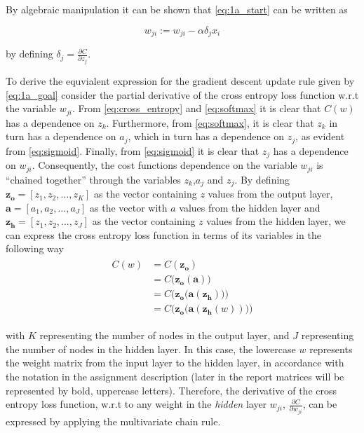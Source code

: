 \documentclass{article}
\begin{document}
By algebraic manipulation it can be shown that \eqref{eq:1a_start} can be written as

\begin{equation}
    w_{j i}:=w_{j i}-\alpha \delta_{j} x_{i}
    \label{eq:1a_goal}
\end{equation}

by defining $\delta_{j}=\frac{\partial C}{\partial z_{j}}$.

To derive the equvialent expression for the gradient descent update rule given by \eqref{eq:1a_goal} consider the partial derivative of the cross entropy loss function w.r.t the variable $w_{ji}$. From \eqref{eq:cross_entropy} and \eqref{eq:softmax} it is clear that $C(w)$ has a dependence on $z_k$. Furthermore, from \eqref{eq:softmax}, it is clear that $z_k$ in turn has a dependence on $a_j$, which in turn has a dependence on $z_j$, as evident from \eqref{eq:sigmoid}. Finally, from \eqref{eq:sigmoid} it is clear that $z_j$ has a dependence on $w_{ji}$. Consequently, the cost functions dependence on the variable $w_{ji}$ is ``chained together'' through the variables $z_k$,$a_j$ and $z_j$. By defining $\boldsymbol{z_{o}} = [z_1,z_2,\dots,z_K]$ as the vector containing $z$ values from the output layer, $\boldsymbol{a} = [a_1,a_2,\dots,a_J]$ as the vector with $a$ values from the hidden layer and $\boldsymbol{z_h} = [z_1,z_2,\dots,z_J]$ as the vector containing $z$ values from the hidden layer, we can express the cross entropy loss function in terms of its variables in the following way
\begin{align}
\begin{split}
    C(w) &= C(\boldsymbol{z_o}) \\ 
    &= C\big(\boldsymbol{z_o}(\boldsymbol{a})\big) \\
    &= C\bigg(\boldsymbol{z_o}\big(\boldsymbol{a}(\boldsymbol{z_h})\big)\bigg) \\
    &= C\bigg(\boldsymbol{z_o}\big(\boldsymbol{a}(\boldsymbol{z_h}(w))\big)\bigg)
    \label{eq:cost_var_def}
\end{split}
\end{align}

with $K$ representing the number of nodes in the output layer, and $J$ representing the number of nodes in the hidden layer. In this case, the lowercase $w$ represents the weight matrix from the input layer to the hidden layer, in accordance with the notation in the assignment description (later in the report matrices will be represented by bold, uppercase letters). Therefore, the derivative of the cross entropy loss function, w.r.t to any weight in the \textit{hidden} layer $w_{ji}$, $\frac{\partial C}{\partial w_{ji}}$, can be expressed by applying the multivariate chain rule.
\end{document}
